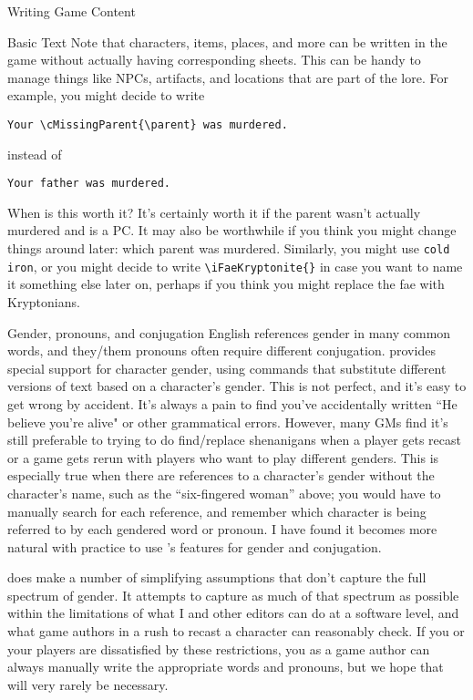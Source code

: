 \documentclass[sheet]{GameTexBase}
\begin{document}
\begin{section}{Writing Game Content}
\begin{subsection}{Basic \gametex{} Text}
Note that characters, items, places, and more can be written in the game without actually having corresponding sheets.  This can be handy to manage things like NPCs, artifacts, and locations that are part of the lore.  For example, you might decide to write 
\begin{verbatim}
Your \cMissingParent{\parent} was murdered.
\end{verbatim}
instead of 
\begin{verbatim}
Your father was murdered.
\end{verbatim}

When is this worth it?  It's certainly worth it if the parent wasn't actually murdered and is a PC.  It may also be worthwhile if you think you might change things around later: which parent was murdered.  Similarly, you might use \lstinline|cold iron|, or you might decide to write \lstinline|\iFaeKryptonite{}| in case you want to name it something else later on, perhaps if you think you might replace the fae with Kryptonians.

\end{subsection}
\begin{subsection}{Gender, pronouns, and conjugation}
\label{gender}
English references gender in many common words, and they/them pronouns often require different conjugation.  \gametex{} provides special support for character gender, using commands that substitute different versions of text based on a character's gender.  This is not perfect, and it's easy to get wrong by accident.  It's always a pain to find you've accidentally written ``He believe you're alive" or other grammatical errors.  However, many GMs find it's still preferable to trying to do find/replace shenanigans when a player gets recast or a game gets rerun with players who want to play different genders.  This is especially true when there are references to a character's gender without the character's name, such as the ``six-fingered woman'' above; you would have to manually search for each reference, and remember which character is being referred to by each gendered word or pronoun.  I have found it becomes more natural with practice to use \gametex{}'s features for gender and conjugation.

\gametex{} does make a number of simplifying assumptions that don't capture the full spectrum of gender.  It attempts to capture as much of that spectrum as possible within the limitations of what I and other \gametex{} editors can do at a software level, and what game authors in a rush to recast a character can reasonably check.  If you or your players are dissatisfied by these restrictions, you as a game author can always manually write the appropriate words and pronouns, but we hope that will very rarely be necessary.


\end{subsection}
\end{section}
\end{document}
